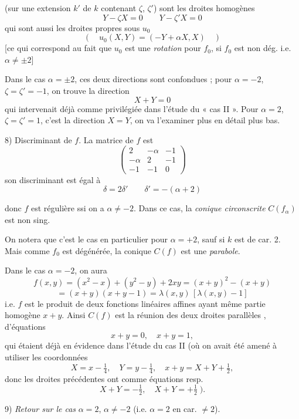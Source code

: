 \documentclass[11pt,a4paper]{article}
\begin{document}
(sur une extension $k'$ de $k$ contenant $\zeta$, $\zeta'$) sont les droites homogènes \struck{\ill{}}
\[
Y - \zeta X = 0 \qquad Y - \zeta' X = 0
\]
qui sont aussi les droites propres sous $u_0$
\[
(\quad u_0(X,Y) = (-Y + \alpha X, X) \quad )
\]
[ce qui correspond au fait que $u_0$ est une \struck{(\ill{})} \emph{rotation} pour $f_0$, si $f_0$ est non dég. i.e. $\alpha \neq \pm 2$]

Dans le cas $\alpha = \pm 2$, ces deux directions sont confondues ; \struck{\ill{}} pour $\alpha = -2$, $\zeta = \zeta' = -1$, on trouve la direction
\[
X + Y = 0
\]
qui intervenait déjà comme privilégiée dans l'étude du « cas II \struck{\ill{}} ». Pour $\alpha = 2$, $\zeta = \zeta' = 1$, c'est la direction $X = Y$, \struck{\ill{}} on va l'examiner plus en détail plus bas.

8) Discriminant  de $f$. La matrice de $f$ est
\[
\begin{pmatrix} 2 & -\alpha & -1 \\ -\alpha & 2 & -1 \\ -1 & -1 & 0 \end{pmatrix}
\]
son discriminant est égal à
\[
\delta = 2\delta' \qquad \delta' = -(\alpha + 2)
\]

donc $f$ est régulière ssi on a $\alpha \neq -2$. Dans ce cas, la \emph{conique circonscrite} $C(f_\alpha)$ est non sing.

On notera que c'est le cas en particulier pour $\alpha = +2$, sauf si $k$ est de car. 2. Mais comme $f_0$ est dégénérée, la conique $C(f)$ est une \emph{parabole}.

Dans le cas $\alpha = -2$, on aura
\[
f(x,y) = (x^2 - x) + (y^2 - y) + 2xy = (x+y)^2 - (x+y)
\]
\[
= (x+y)(x+y-1) = \lambda(x,y)\,[\lambda(x,y) - 1]
\]
i.e. $f$ est le produit de deux fonctions linéaires affines ayant même partie homogène $x + y$. Ainsi $C(f)$ est la réunion des deux droites parallèles , d'équations
\[
x + y = 0, \quad x + y = 1,
\]
qui étaient déjà en évidence dans l'étude du cas II (où on avait été amené à utiliser les coordonnées
\[
X = x - \tfrac14, \quad Y = y - \tfrac14, \quad x + y = X + Y + \tfrac12,
\]
donc les droites précédentes ont comme équations resp.
\[
X + Y = -\tfrac12, \quad X + Y = +\tfrac12 \; ).
\]

9) \emph{Retour sur le cas} $\alpha = 2$, $\alpha \neq -2$ (i.e. $\alpha = 2$ en car. $\neq 2$).
\end{document}

